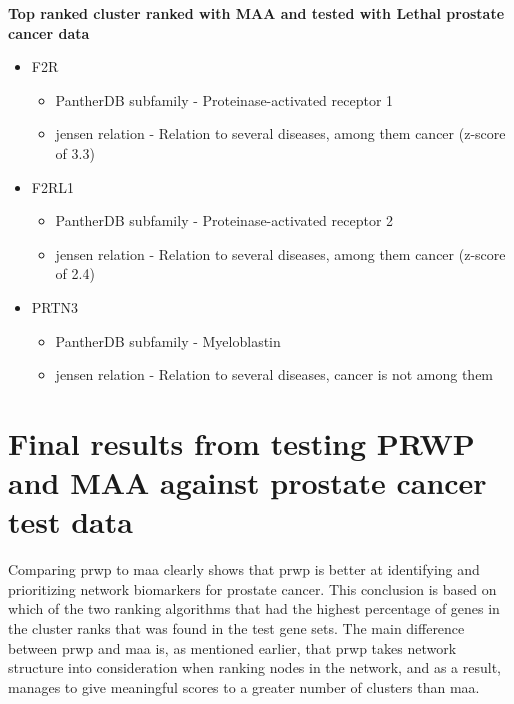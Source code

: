 \textbf{Top ranked cluster ranked with MAA and tested with Lethal prostate cancer data}

\begin{itemize}
    \item F2R
        \begin{itemize}
            \item PantherDB subfamily - Proteinase-activated receptor 1
            \item \gls{jensen} relation -  Relation to several diseases, among
                them cancer (z-score of 3.3)
        \end{itemize}
    \item F2RL1
        \begin{itemize}
            \item PantherDB subfamily - Proteinase-activated receptor 2
            \item \gls{jensen} relation - Relation to several diseases, among
                them cancer (z-score of 2.4)
        \end{itemize}
    \item PRTN3
        \begin{itemize}
            \item PantherDB subfamily - Myeloblastin
            \item \gls{jensen} relation - Relation to several diseases, cancer
                is not among them
        \end{itemize}
\end{itemize}

\section{Final results from testing PRWP and MAA against prostate cancer test data}
Comparing \gls{prwp} to \gls{maa} clearly shows that \gls{prwp} is better at
identifying and prioritizing network biomarkers for prostate cancer. This
conclusion is based on which of the two ranking algorithms that had the highest
percentage of genes in the cluster ranks that was found in the test gene sets.
The main difference between \gls{prwp} and \gls{maa} is, as mentioned earlier,
that \gls{prwp} takes network structure into consideration when ranking nodes in
the network, and as a result, manages to give meaningful scores to a greater
number of clusters than \gls{maa}.


